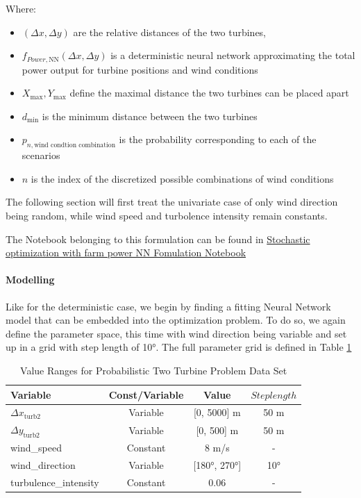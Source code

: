 \documentclass[preprint,12pt]{elsarticle}
\begin{document}
Where:
\begin{itemize}
	\item \( (\Delta x, \Delta y) \) are the relative distances of the two turbines,
	\item \( f_{Power, \text{NN}}(\Delta x, \Delta y)\) is a deterministic neural network  approximating the total power output for turbine positions and wind conditions
	\item \(  X_{\max}, Y_{\max} \) define the maximal distance the two turbines can be placed apart
	\item \( d_{\min} \) is the minimum distance between the two turbines
	\item \(p_{n, \text{wind condtion combination}}\) is the probability corresponding to each of the scenarios
	\item \( n \) is the index of the discretized possible combinations of wind conditions 
\end{itemize}

The following section will first treat the univariate case of only wind direction being random, while wind speed and turbolence intensity remain constants. 


The Notebook belonging to this formulation can be found in \href{https://github.com/schmeti/uc3m_TFM_wind_farm_optimization_codebase/blob/main/Windfarm_power_modelling/0_two_turbine_problem_constrLearn_probweighted.ipynb}{Stochastic optimization with farm power NN Fomulation Notebook} \cite{schmetz2025twoturbine_stoch1}

\paragraph{Modelling}

Like for the deterministic case, we begin by finding a fitting Neural Network model that can be embedded into the optimization problem. To do so, we again define the parameter space, this time with wind direction being variable and set up in a grid with step length of 10°. The full parameter grid is defined in Table \ref{tab:val_prob_data}

\begin{table}[ht]
	\centering
	\caption{Value Ranges for Probabilistic Two Turbine Problem Data Set}
	\begin{tabular}{|l|c|c|c|}
		\hline
		\textbf{Variable} & \textbf{Const/Variable} & \textbf{Value} & \textbf{$Steplength$}\\
		\hline
		$\Delta x_{\text{turb2}}$ & Variable & [0, 5000] m & 50 m\\
		$\Delta y_{\text{turb2}}$ & Variable & [0, 500] m  & 50 m\\
		wind\_speed & Constant & 8 m/s & -\\
		wind\_direction & Variable & [180°, 270°]& 10° \\
		turbulence\_intensity & Constant & 0.06 & - \\
		\hline
	\end{tabular}
	\label{tab:val_prob_data}
\end{table}
\end{document}
